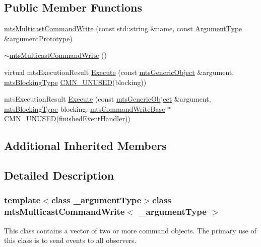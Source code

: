 \subsection*{Public Member Functions}
\begin{DoxyCompactItemize}
\item 
\hyperlink{classmts_multicast_command_write_af6df9513f0bbc9dccd2775429db99bb9}{mts\+Multicast\+Command\+Write} (const std\+::string \&name, const \hyperlink{classmts_multicast_command_write_a064ab3c37be15f5f41dc6fd39595f207}{Argument\+Type} \&argument\+Prototype)
\item 
\hyperlink{classmts_multicast_command_write_ae364a240cfc90e4c0cfa2316fc8471f8}{$\sim$mts\+Multicast\+Command\+Write} ()
\item 
virtual mts\+Execution\+Result \hyperlink{classmts_multicast_command_write_a791d2a0dd7453735f3c5859107f855fb}{Execute} (const \hyperlink{classmts_generic_object}{mts\+Generic\+Object} \&argument, \hyperlink{mts_forward_declarations_8h_ad7426ccb6c883bc780d0ee197dddcbe7}{mts\+Blocking\+Type} \hyperlink{cmn_portability_8h_a021894e2626935fa2305434b1e893ff6}{C\+M\+N\+\_\+\+U\+N\+U\+S\+E\+D}(blocking))
\item 
mts\+Execution\+Result \hyperlink{classmts_multicast_command_write_abdd5968cb00cca869eb59be2ff83cc1c}{Execute} (const \hyperlink{classmts_generic_object}{mts\+Generic\+Object} \&argument, \hyperlink{mts_forward_declarations_8h_ad7426ccb6c883bc780d0ee197dddcbe7}{mts\+Blocking\+Type} blocking, \hyperlink{classmts_command_write_base}{mts\+Command\+Write\+Base} $\ast$\hyperlink{cmn_portability_8h_a021894e2626935fa2305434b1e893ff6}{C\+M\+N\+\_\+\+U\+N\+U\+S\+E\+D}(finished\+Event\+Handler))
\end{DoxyCompactItemize}
\subsection*{Additional Inherited Members}


\subsection{Detailed Description}
\subsubsection*{template$<$class \+\_\+argument\+Type$>$class mts\+Multicast\+Command\+Write$<$ \+\_\+argument\+Type $>$}

This class contains a vector of two or more command objects. The primary use of this class is to send events to all observers. 


